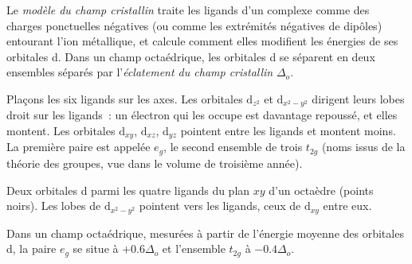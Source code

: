 \begin{definition}\label{def:b2:ligand-field:crystal-field}
Le \emph{modèle du champ cristallin} traite les ligands d'un
complexe comme des charges ponctuelles négatives (ou comme les extrémités négatives de dipôles) entourant l'ion
métallique, et calcule comment elles modifient les énergies de ses orbitales d. Dans un champ
octaédrique, les orbitales d se séparent en deux ensembles séparés par l'\emph{éclatement du champ
cristallin} $\Delta_o$.
\end{definition}

Plaçons les six ligands sur les axes. Les orbitales $\mathrm d_{z^2}$ et $\mathrm d_{x^2-y^2}$
dirigent leurs lobes droit sur les ligands~: un électron qui les occupe est davantage repoussé,
et elles montent. Les orbitales $\mathrm d_{xy}$, $\mathrm d_{xz}$, $\mathrm d_{yz}$ pointent entre
les ligands et montent moins. La première paire est appelée $e_g$, le second ensemble de trois
$t_{2g}$ (noms issus de la théorie des groupes, vue dans le volume de troisième année).

\begin{omfigure}

{\small Deux orbitales d parmi les quatre ligands du plan $xy$ d'un octaèdre
(points noirs). Les lobes de $\mathrm d_{x^2-y^2}$ pointent vers les ligands, ceux de
$\mathrm d_{xy}$ entre eux.}
\end{omfigure}

\begin{theorem}[Barycentre]\label{thm:b2:ligand-field:barycentre}
Dans un champ octaédrique, mesurées à partir de l'énergie moyenne des orbitales d, la
paire $e_g$ se situe à $+0.6\Delta_o$ et l'ensemble $t_{2g}$ à $-0.4\Delta_o$.
\end{theorem}

